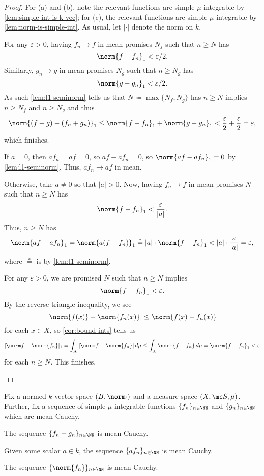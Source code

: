 \documentclass[../notes.tex]{subfiles}
\begin{document}
\begin{proof}
	For (a) and (b), note the relevant functions are simple $\mu$-integrable by \autoref{lem:simple-int-is-k-vec}; for (c), the relevant functions are simple $\mu$-integrable by \autoref{lem:norm-is-simple-int}. As usual, let $|\cdot|$ denote the norm on $k$.
	\begin{listalph}
		\item For any $\varepsilon>0$, having $f_n\to f$ in mean promises $N_f$ such that $n\ge N$ has
		\[\norm{f-f_n}_1<\varepsilon/2.\]
		Similarly, $g_n\to g$ in mean promises $N_g$ such that $n\ge N_g$ has
		\[\norm{g-g_n}_1<\varepsilon/2.\]
		As such \autoref{lem:l1-seminorm} tells us that $N\coloneqq\max\{N_f,N_g\}$ has $n\ge N$ implies $n\ge N_f$ and $n\ge N_g$ and thus
		\[\norm{(f+g)-(f_n+g_n)}_1\le\norm{f-f_n}_1+\norm{g-g_n}_1<\frac\varepsilon2+\frac\varepsilon2=\varepsilon,\]
		which finishes.
		\item If $a=0$, then $af_n=af=0$, so $af-af_n=0$, so $\norm{af-af_n}_1=0$ by \autoref{lem:l1-seminorm}. Thus, $af_n\to af$ in mean.

		Otherwise, take $a\ne0$ so that $|a|>0$. Now, having $f_n\to f$ in mean promises $N$ such that $n\ge N$ has
		\[\norm{f-f_n}_1<\frac\varepsilon{|a|}.\]
		Thus, $n\ge N$ has
		\[\norm{af-af_n}_1=\norm{a(f-f_n)}_1\stackrel*=|a|\cdot\norm{f-f_n}_1<|a|\cdot\frac\varepsilon{|a|}=\varepsilon,\]
		where $\stackrel*=$ is by \autoref{lem:l1-seminorm}.
		\item For any $\varepsilon>0$, we are promised $N$ such that $n\ge N$ implies
		\[\norm{f-f_n}_1<\varepsilon.\]
		By the reverse triangle inequality, we see
		\[|\norm{f(x)}-\norm{f_n(x)}|\le\norm{f(x)-f_n(x)}\]
		for each $x\in X$, so \autoref{cor:bound-ints} tells us
		\[|\norm f-\norm{f_n}|_1=\int_X|\norm f-\norm{f_n}|\,d\mu\le\int_X\norm{f-f_n}\,d\mu=\norm{f-f_n}_1<\varepsilon\]
		for each $n\ge N$. This finishes.
		\qedhere
	\end{listalph}
\end{proof}
\begin{lemma} \label{lem:linear-combo-mean-cauchy}
	Fix a normed $k$-vector space $(B,\norm\cdot)$ and a measure space $(X,\mc S,\mu)$. Further, fix a sequence of simple $\mu$-integrable functions $\{f_n\}_{n\in\NN}$ and $\{g_n\}_{n\in\NN}$ which are mean Cauchy.
	\begin{listalph}
		\item The sequence $\{f_n+g_n\}_{n\in\NN}$ is mean Cauchy.
		\item Given some scalar $a\in k$, the sequence $\{af_n\}_{n\in\NN}$ is mean Cauchy.
		\item The sequence $\{\norm{f_n}\}_{n\in\NN}$ is mean Cauchy.
	\end{listalph}
\end{lemma}
\end{document}
